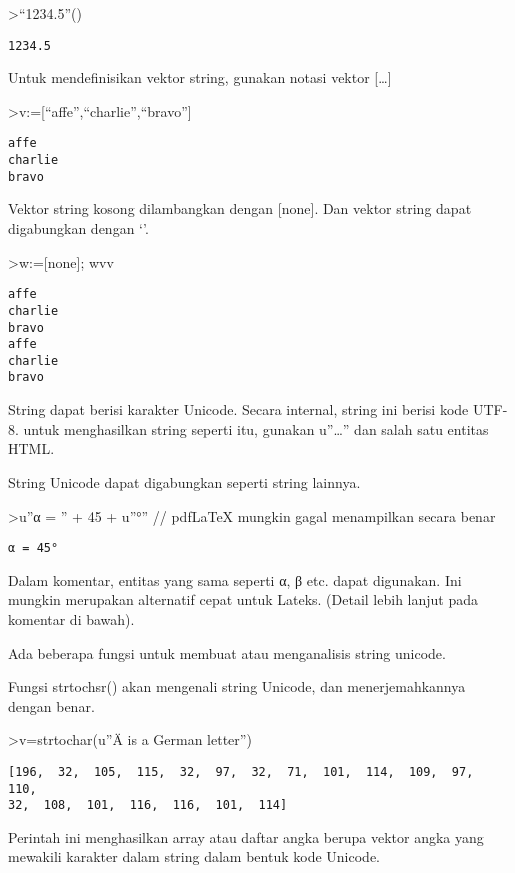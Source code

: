 \documentclass[
]{book}
\begin{document}
\textgreater{}``1234.5''()

\begin{verbatim}
1234.5
\end{verbatim}

Untuk mendefinisikan vektor string, gunakan notasi vektor {[}\ldots{]}

\textgreater v:={[}``affe'',``charlie'',``bravo''{]}

\begin{verbatim}
affe
charlie
bravo
\end{verbatim}

Vektor string kosong dilambangkan dengan {[}none{]}. Dan vektor string dapat digabungkan dengan `\textbar{}'.

\textgreater w:={[}none{]}; w\textbar v\textbar v

\begin{verbatim}
affe
charlie
bravo
affe
charlie
bravo
\end{verbatim}

String dapat berisi karakter Unicode. Secara internal, string ini berisi kode UTF-8. untuk menghasilkan string seperti itu, gunakan u''\ldots'' dan salah satu entitas HTML.

String Unicode dapat digabungkan seperti string lainnya.

\textgreater u''α = '' + 45 + u''°'' // pdfLaTeX mungkin gagal menampilkan secara benar

\begin{verbatim}
α = 45°
\end{verbatim}

Dalam komentar, entitas yang sama seperti α, β etc. dapat digunakan. Ini mungkin merupakan alternatif cepat untuk Lateks. (Detail lebih lanjut pada komentar di bawah).

Ada beberapa fungsi untuk membuat atau menganalisis string unicode.

Fungsi strtochsr() akan mengenali string Unicode, dan menerjemahkannya dengan benar.

\textgreater v=strtochar(u''Ä is a German letter'')

\begin{verbatim}
[196,  32,  105,  115,  32,  97,  32,  71,  101,  114,  109,  97,  110,
32,  108,  101,  116,  116,  101,  114]
\end{verbatim}

Perintah ini menghasilkan array atau daftar angka berupa vektor angka yang mewakili karakter dalam string dalam bentuk kode Unicode.
\end{document}
